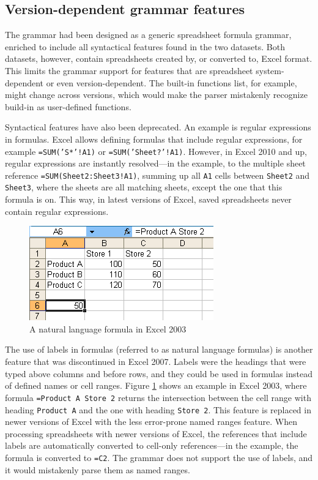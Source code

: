 \documentclass[conference]{IEEEtran}
\begin{document}
\subsection{Version-dependent grammar features}
The grammar had been designed as a generic spreadsheet formula grammar, enriched to include all syntactical features found in the two datasets. Both datasets, however, contain spreadsheets created by, or converted to, Excel format. This limits the grammar support for features that are spreadsheet system-dependent or even version-dependent. The built-in functions list, for example, might change across versions, which would make the parser mistakenly recognize build-in as user-defined functions.

Syntactical features have also been deprecated. An example is regular expressions in formulas. Excel allows defining formulas that include regular expressions, for example \texttt{=SUM('S*'!A1)} or \texttt{=SUM('Sheet?'!A1)}. However, in Excel 2010 and up, regular expressions are instantly resolved---in the example, to the multiple sheet reference \texttt{=SUM(Sheet2:Sheet3!A1)}, summing up all \texttt{A1} cells between \texttt{Sheet2} and \texttt{Sheet3}, where the sheets are all matching sheets, except the one that this formula is on. This way, in latest versions of Excel, saved spreadsheets never contain regular expressions.
\begin{figure}
	\caption{A natural language formula in Excel 2003}
	\label{fig:labels}
	\centering
	\includegraphics{labels}
\end{figure}

The use of labels in formulas (referred to as natural language formulas) is another feature that was discontinued in Excel 2007. Labels were the headings that were typed above columns and before rows, and they could be used in formulas instead of defined names or cell ranges. Figure \ref{fig:labels} shows an example in Excel 2003, where formula \texttt{=Product A Store 2} returns the intersection between the cell range with heading \texttt{Product A} and the one with heading \texttt{Store 2}. This feature is replaced in newer versions of Excel with the less error-prone named ranges feature. When processing spreadsheets with newer versions of Excel, the references that include labels are automatically converted to cell-only references---in the example, the formula is converted to \texttt{=C2}. The grammar does not support the use of labels, and it would mistakenly parse them as named ranges.
\end{document}
